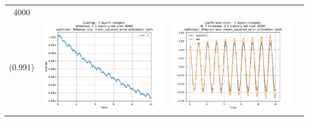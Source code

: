 \documentclass{article}
\begin{document}
\begin{tabular}{|c|c|c|c|}
     4000 \\ (0.991) &
     \includegraphics[scale=0.37]{./Searching_for_good_train_set_size/2_layers_simple_train_samples=4000_timestep=0.1_t_total=10.0_optimizer=Adamax_loss=mean_squared_error_activation=tanh/Overlap.png} &
     \includegraphics[scale=0.37]{./Searching_for_good_train_set_size/2_layers_simple_train_samples=4000_timestep=0.1_t_total=10.0_optimizer=Adamax_loss=mean_squared_error_activation=tanh/Coeff_N=7_(real).png} &

\end{tabular}
\end{document}
